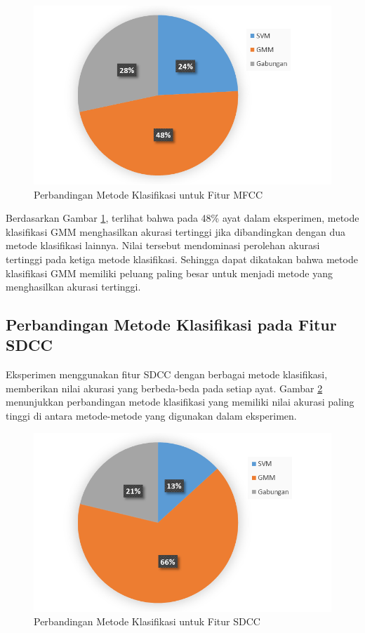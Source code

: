   \begin{figure}
    \centering
    \includegraphics[width=0.9\linewidth]{pics/piefeat0}
    \caption{Perbandingan Metode Klasifikasi untuk Fitur MFCC}
    \label{fig:piefeat0}
  \end{figure}

  Berdasarkan Gambar \ref{fig:piefeat0}, terlihat bahwa pada 48\% ayat dalam eksperimen, metode klasifikasi GMM menghasilkan akurasi tertinggi jika dibandingkan dengan dua metode klasifikasi lainnya. Nilai tersebut mendominasi perolehan akurasi tertinggi pada ketiga metode klasifikasi. Sehingga dapat dikatakan bahwa metode klasifikasi GMM memiliki peluang paling besar untuk menjadi metode yang menghasilkan akurasi tertinggi.



  \subsection{Perbandingan Metode Klasifikasi pada Fitur SDCC}
  Eksperimen menggunakan fitur SDCC dengan berbagai metode klasifikasi, memberikan nilai akurasi yang berbeda-beda pada setiap ayat. Gambar \ref{fig:piefeat1} menunjukkan perbandingan metode klasifikasi yang memiliki nilai akurasi paling tinggi di antara metode-metode yang digunakan dalam eksperimen.

  \begin{figure}
    \centering
    \includegraphics[width=0.9\linewidth]{pics/piefeat1}
    \caption{Perbandingan Metode Klasifikasi untuk Fitur SDCC}
    \label{fig:piefeat1}
  \end{figure}

